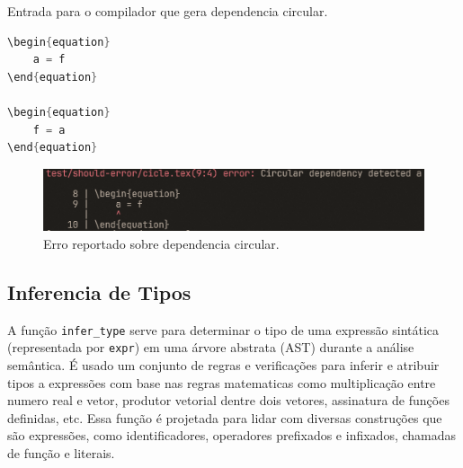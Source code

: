 
\begin{codigo}[htb]
    \caption{\small Entrada para o compilador que gera dependencia circular. }
    \label{cod-grafo-simbol-deps}
\begin{lstlisting}[language=C, numbers=none, frame=none, inputencoding=latin1]
\begin{equation}
    a = f
\end{equation}

\begin{equation}
    f = a
\end{equation}

\end{lstlisting}
\end{codigo}

\begin{figure}[H]
    \caption{\label{label} \small Erro reportado sobre dependencia circular.}
    \begin{center}
        \includegraphics[scale=0.5]{./Imagens/error-circular-deps.png}
    \end{center}
\end{figure}


\subsection{Inferencia de Tipos} \label{subsection-inferencia-tipos}


A função \verb`infer_type` serve para determinar o tipo de uma expressão sintática (representada por \verb`expr`) em uma árvore abstrata (AST) durante a análise semântica. É usado um conjunto de regras e verificações para inferir e atribuir tipos a expressões com base nas regras matematicas como multiplicação entre numero real e vetor, produtor vetorial dentre dois vetores, assinatura de funções definidas, etc.  Essa função é projetada para lidar com diversas construções que são expressões, como identificadores, operadores prefixados e infixados, chamadas de função e literais.



